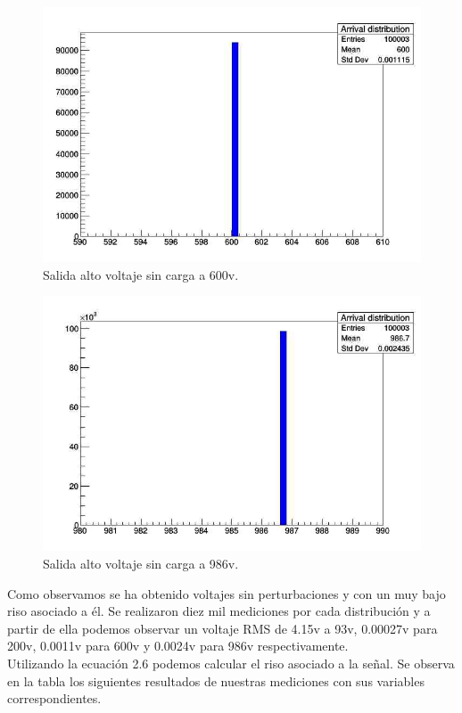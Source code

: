 \begin{figure}[H]
\centering
\includegraphics[width=12cm]{Capitulo4/600v.jpg}
\caption{Salida alto voltaje sin carga a 600v.}
\end{figure}

\begin{figure}[H]
\centering
\includegraphics[width=12cm]{Capitulo4/986v.jpg}
\caption{Salida alto voltaje sin carga a 986v.}
\end{figure}
\newpage

Como observamos se ha obtenido voltajes sin perturbaciones y con un muy bajo riso asociado a él. Se realizaron diez mil mediciones por cada distribución y a partir de ella podemos observar un voltaje RMS de 4.15v a 93v, 0.00027v para 200v, 0.0011v para 600v y 0.0024v para 986v respectivamente. \\

Utilizando la ecuación 2.6 podemos calcular el riso asociado a la señal. Se observa en la tabla los siguientes resultados de nuestras mediciones con sus variables correspondientes. 

